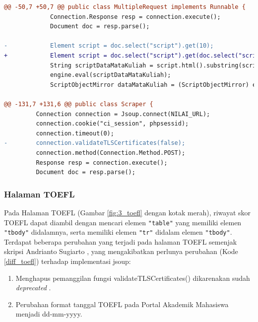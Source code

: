         
        \begin{lstlisting}[language=diff, caption=Perubahan Implementasi Jsoup Halaman Daftar Perkembangan Studi, label=diff_halaman_dps]
@@ -50,7 +50,7 @@ public class MultipleRequest implements Runnable {
             Connection.Response resp = connection.execute();
             Document doc = resp.parse();

-            Element script = doc.select("script").get(10);
+            Element script = doc.select("script").get(doc.select("script").size()-1);
             String scriptDataMataKuliah = script.html().substring(script.html().indexOf("var data_mata_kuliah = [];"), script.html().indexOf("var data_angket = [];"));
             engine.eval(scriptDataMataKuliah);
             ScriptObjectMirror dataMataKuliah = (ScriptObjectMirror) engine.get("data_mata_kuliah");
             
@@ -131,7 +131,6 @@ public class Scraper {
         Connection connection = Jsoup.connect(NILAI_URL);
         connection.cookie("ci_session", phpsessid);
         connection.timeout(0);
-        connection.validateTLSCertificates(false);
         connection.method(Connection.Method.POST);
         Response resp = connection.execute();
         Document doc = resp.parse();
        \end{lstlisting}
        
        
\subsubsection{Halaman TOEFL}
Pada Halaman TOEFL (Gambar \ref{fig:3_toefl} dengan kotak merah), riwayat skor TOEFL dapat diambil dengan mencari elemen \texttt{"table"} yang memiliki elemen \texttt{"tbody"} didalamnya, serta memiliki elemen \texttt{"tr"} didalam elemen \texttt{"tbody"}.
Terdapat beberapa perubahan yang terjadi pada halaman TOEFL semenjak skripsi Andrianto Sugiarto \cite{ifstupor}, yang mengakibatkan perlunya perubahan (Kode \ref{diff_toefl}) terhadap implementasi jsoup:

    \begin{enumerate}
        \item Menghapus pemanggilan fungsi validateTLSCertificates() dikarenakan sudah \textit{deprecated} \cite{jsoup}.
        \item Perubahan format tanggal TOEFL pada Portal Akademik Mahasiswa menjadi dd-mm-yyyy.
    \end{enumerate}
       
